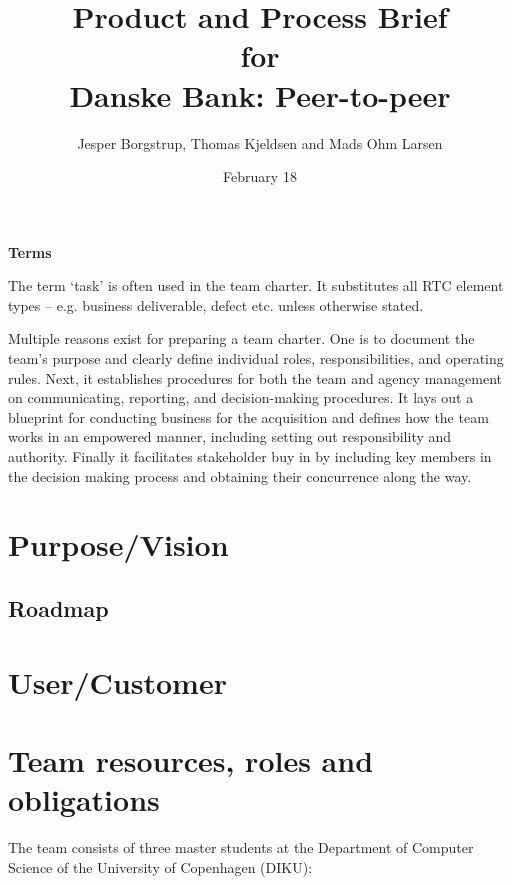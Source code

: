 \documentclass[a4paper,11pt]{article}
\title{Product and Process Brief\\\small{for}\\\small{Danske Bank: Peer-to-peer}}
\author{ Jesper Borgstrup, Thomas Kjeldsen and Mads Ohm Larsen }
\date{February 18}
\begin{document}
\ifpdf
{}
\else
{}
\fi

\maketitle

\tableofcontents
\vspace{2cm}

\noindent\textbf{Terms}

The term ‘task’ is often used in the team charter. 
It substitutes all RTC element types – e.g. business deliverable, defect etc. unless otherwise stated.

\pagebreak
Multiple reasons exist for preparing a team charter. One is to document the team’s purpose and clearly define individual roles, responsibilities, and operating rules. Next, it establishes procedures for both the team and agency management on communicating, reporting, and decision-making procedures. It lays out a blueprint for conducting business for the acquisition and defines how the team works in an empowered manner, including setting out responsibility and authority. Finally it facilitates stakeholder buy in by including key members in the decision making process and obtaining their concurrence along the way. 

\section{Purpose/Vision} %
\label{sec:purpose_vision}

\subsection{Roadmap} %
\label{subsec:roadmap}



\section{User/Customer} %
\label{sec:user_customer}


\section{Team resources, roles and obligations} %
\label{sec:team_resources_roles_and_obligations}
The team consists of three master students at the Department of Computer Science of the University of Copenhagen (DIKU): 
\end{document}
